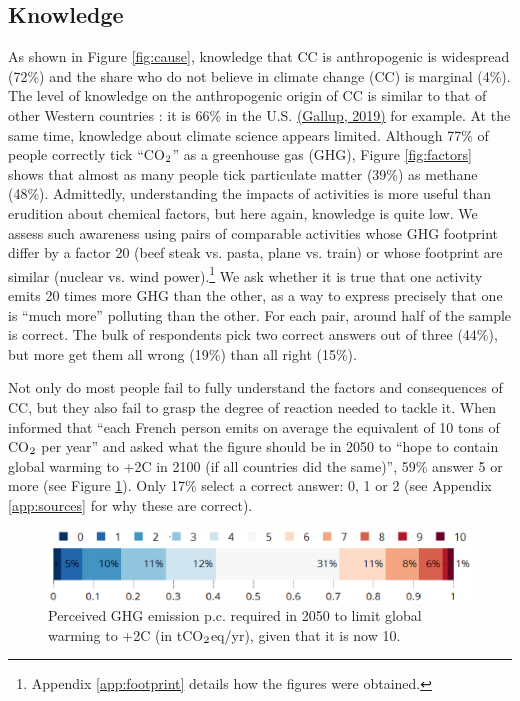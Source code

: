 \documentclass[english,5p,authoryear]{elsarticle}
\begin{document}
    \subsection{Knowledge\label{subsec:knowledge}}
As shown in Figure \ref{fig:cause}, knowledge that CC is anthropogenic is widespread (72\%) and the share who do not believe in climate change (CC) is marginal (4\%). The level of knowledge on the anthropogenic origin of CC is similar to that of other Western countries \citep{leiserowitz_international_2007,lee_predictors_2015,stokes_global_2015-1}: it is 66\% in the U.S. \href{https://news.gallup.com/poll/1615/environment.aspx}{(Gallup, 2019)} for example. At the same time, knowledge about climate science appears limited. Although 77\% of people correctly tick ``CO$_\textnormal{2}$'' as a greenhouse gas (GHG), Figure \ref{fig:factors} shows that almost as many people tick particulate matter (39\%) as methane (48\%). Admittedly, understanding the impacts of activities is more useful than erudition about chemical factors, but here again, knowledge is quite low. We assess such awareness using pairs of comparable activities whose GHG footprint differ by a factor 20 (beef steak vs. pasta, plane vs. train) or whose footprint are similar (nuclear vs. wind power).\footnote{Appendix \ref{app:footprint} details how the figures were obtained.} We ask whether it is true that one activity emits 20 times more GHG than the other, as a way to express precisely that one is ``much more'' polluting than the other. For each pair, around half of the sample is correct. The bulk of respondents pick two correct answers out of three (44\%), but more get them all wrong (19\%) than all right (15\%). 

Not only do most people fail to fully understand the factors and consequences of CC, but they also fail to grasp the degree of reaction needed to tackle it. When informed that ``each French person emits on average the equivalent of 10 tons of CO$_\textnormal{2}$ per year'' and asked what the figure should be in 2050 to ``hope to contain global warming to +2\textdegree{}C in 2100 (if all countries did the same)'', 59\% answer 5 or more (see Figure \ref{fig:target_emission}). Only 17\% select a correct answer: 0, 1 or 2 (see Appendix \ref{app:sources} for why these are correct).

\begin{figure}[t]
\centering
\includegraphics[width=\columnwidth]{Images_EPS/CC_target_emission_nolegend.eps}
\caption{Perceived GHG emission p.c. required in 2050 to limit global warming to +2\textdegree{}C (in tCO$_\textnormal{2}$eq/yr), given that it is now 10.}
\label{fig:target_emission}
\end{figure}
\end{document}
